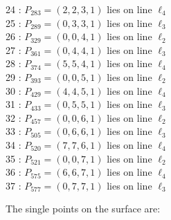 \documentclass{article}
\begin{document}
{\begin{multicols}{2}
24 : $P_{283}=( 2, 2, 3, 1 )$ lies on line $\ell_{4}$\\
25 : $P_{289}=( 0, 3, 3, 1 )$ lies on line $\ell_{3}$\\
26 : $P_{329}=( 0, 0, 4, 1 )$ lies on line $\ell_{2}$\\
27 : $P_{361}=( 0, 4, 4, 1 )$ lies on line $\ell_{3}$\\
28 : $P_{374}=( 5, 5, 4, 1 )$ lies on line $\ell_{4}$\\
29 : $P_{393}=( 0, 0, 5, 1 )$ lies on line $\ell_{2}$\\
30 : $P_{429}=( 4, 4, 5, 1 )$ lies on line $\ell_{4}$\\
31 : $P_{433}=( 0, 5, 5, 1 )$ lies on line $\ell_{3}$\\
32 : $P_{457}=( 0, 0, 6, 1 )$ lies on line $\ell_{2}$\\
33 : $P_{505}=( 0, 6, 6, 1 )$ lies on line $\ell_{3}$\\
34 : $P_{520}=( 7, 7, 6, 1 )$ lies on line $\ell_{4}$\\
35 : $P_{521}=( 0, 0, 7, 1 )$ lies on line $\ell_{2}$\\
36 : $P_{575}=( 6, 6, 7, 1 )$ lies on line $\ell_{4}$\\
37 : $P_{577}=( 0, 7, 7, 1 )$ lies on line $\ell_{3}$\\
\end{multicols}
The single points on the surface are:\\
}
\end{document}
